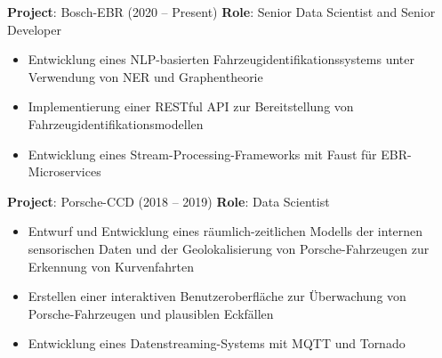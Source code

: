 \begin{experiences}
{    \textbf{Project}: Bosch-EBR (2020 -- Present)\newline
    \textbf{Role}: Senior Data Scientist and Senior Developer
    \begin{itemize}
      \item Entwicklung eines NLP-basierten Fahrzeugidentifikationssystems unter Verwendung von NER und Graphentheorie
      \item Implementierung einer RESTful API zur Bereitstellung von Fahrzeugidentifikationsmodellen
      \item Entwicklung eines Stream-Processing-Frameworks mit Faust für EBR-Microservices
    \end{itemize}
    \vspace{0.1cm}

    \textbf{Project}: Porsche-CCD (2018 -- 2019)\newline
    \textbf{Role}: Data Scientist
    \begin{itemize}
      \item Entwurf und Entwicklung eines räumlich-zeitlichen Modells der internen sensorischen Daten und der Geolokalisierung von Porsche-Fahrzeugen zur Erkennung von Kurvenfahrten
      \item Erstellen einer interaktiven Benutzeroberfläche zur Überwachung von Porsche-Fahrzeugen und plausiblen Eckfällen
      \item Entwicklung eines Datenstreaming-Systems mit MQTT und Tornado
    \end{itemize}
    \vspace{0.1cm}

}
\end{experiences}

